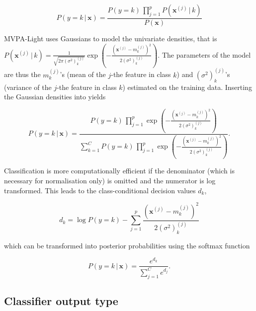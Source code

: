 \documentclass[utf8]{frontiersSCNS} %
\newcommand{\mf}[2]{m_#1^{(#2)}}
\newcommand{\sig}[2]{(\sigma^2)_#1^{(#2)}}
\newcommand{\x}{\mathbf{x}}
\newcommand{\xf}[1]{\mathbf{x}^{(#1)}} %
\begin{document}
\begin{equation}
\label{eq:naive_bayes}
P(y = k\,|\,\x) = \frac{P(y = k)\,\prod_{j=1}^p P(\xf{j}\,|\,k)}{P(\x)}
\end{equation}

MVPA-Light uses Gaussians to model the univariate densities, that is $P(\xf{j}\,|\,k) = \frac{1}{\sqrt{2\pi\sig{k}{j}}} \exp(-\frac{(\xf{j} - \mf{k}{j})^2}{2\sig{k}{j}})$. The parameters of the model are thus the $\mf{k}{j}$'s (mean of the $j$-the feature in class $k$) and $\sig{k}{j}$'s (variance of the $j$-the feature in class $k$) estimated on the training data. Inserting the Gaussian densities into  yields

\begin{equation}
\label{eq:naive_bayes_gaussian}
P(y = k\,|\,\x) = \frac{P(y = k)\,\prod_{j=1}^p \exp(-\frac{(\xf{j} - \mf{k}{j})^2}{2\sig{k}{j}})}%
{\sum_{k=1}^C P(y = k)\,\prod_{j=1}^p \exp(-\frac{(\xf{j} - \mf{k}{j})^2}{2\sig{k}{j}})}.
\end{equation}

Classification is more computationally efficient if the denominator (which is necessary for normalisation only) is omitted and the numerator is log transformed. This leads to the class-conditional decision values $d_k$,

\begin{equation}
\label{eq:naive_bayes_dval}
d_k = \log P(y = k) - \sum_{j=1}^p \frac{(\xf{j} - \mf{k}{j})^2}{2\sig{k}{j}}
\end{equation}

which can be transformed into posterior probabilities using the softmax function 

\begin{equation}
\label{eq:naive_bayes_softmax}
P(y = k\,|\,\x) = \frac{e^{d_k}}{\sum_{j=1}^C e^{d_j}}.
\end{equation}

\subsection{Classifier output type}\label{sec:output}
\end{document}
